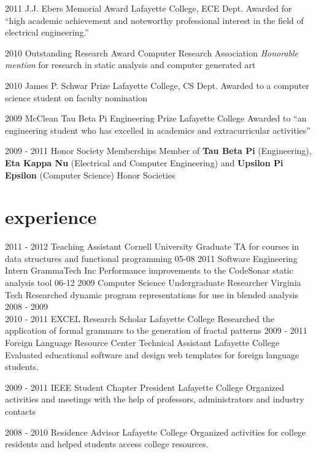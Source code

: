 \documentclass[print]{cv}
\begin{document}
\begin{entrylist}
  \entry
    {2011}
    {J.J. Ebers Memorial Award}
    {Lafayette College, ECE Dept.}
    {Awarded for ``high academic achievement and noteworthy professional
    interest in the field of electrical engineering.''}

  \entry
    {2010}
    {Outstanding Research Award}
    {Computer Research Association}
    {{\it Honorable mention} for research in static analysis and computer generated art}

  \entry
    {2010}
    {James P. Schwar Prize}
    {Lafayette College, CS Dept.}
    {Awarded to a computer science student on faculty nomination}

  \entry
    {2009}
    {McClean Tau Beta Pi Engineering Prize}
    {Lafayette College}
    {Awarded to ``an engineering student who has excelled in academics and extracurricular activities''}

  \entry
    {2009 - 2011}
    {Honor Society Memberships}
    {}
    {
      Member of {\bf Tau Beta Pi} (Engineering),
      {\bf Eta Kappa Nu} (Electrical and Computer Engineering)
      and {\bf Upsilon Pi Epsilon} (Computer Science) Honor Societies}
\end{entrylist}


\section{experience}

\begin{entrylist}
  \entry
    {2011 - 2012}
    {Teaching Assistant}
    {Cornell University}
    {Graduate TA for courses in data structures and functional programming}
  \entry
    {05-08 2011}
    {Software Engineering Intern}
    {GrammaTech Inc}
    {Performance improvements to the CodeSonar static analysis tool}
  \entry
    {06-12 2009}
    {Computer Science Undergraduate Researcher}
    {Virginia Tech}
    {Researched dynamic program representations for use in blended analysis}
  \entry
    {2008 - 2009\\
     2010 - 2011}
    {EXCEL Research Scholar}
    {Lafayette College}
    {Researched the application of formal grammars to the generation of fractal patterns
}
  \entry
    {2009 - 2011}
    {Foreign Language Resource Center Technical Assistant}
    {Lafayette College}
    {Evaluated educational software and design web templates for foreign
      language students. }

  \entry
    {2009 - 2011}
    {IEEE Student Chapter President}
    {Lafayette College}
    {Organized activities and meetings with the help of professors,
      administrators and industry contacts }

  \entry
    {2008 - 2010}
    {Residence Advisor}
    {Lafayette College}
    {Organized activities for college residents and helped students access
      college resources.}

\end{entrylist}
\end{document}
